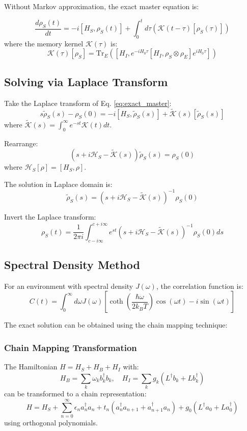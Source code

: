 \documentclass[12pt]{article}
\begin{document}
Without Markov approximation, the exact master equation is:

\begin{equation}
\frac{d\rho_S(t)}{dt} = -i[H_S, \rho_S(t)] + \int_0^t d\tau \left( \mathcal{K}(t-\tau)[\rho_S(\tau)] \right)
\label{eq:exact_master}
\end{equation}
where the memory kernel $\mathcal{K}(\tau)$ is:
\[
\mathcal{K}(\tau)[\rho_S] = \text{Tr}_E\left( [H_I, e^{-iH_0\tau}[H_I, \rho_S \otimes \rho_E] e^{iH_0\tau}] \right)
\]

\subsection{Solving via Laplace Transform}

Take the Laplace transform of Eq. \eqref{eq:exact_master}:
\[
s\tilde{\rho}_S(s) - \rho_S(0) = -i[H_S, \tilde{\rho}_S(s)] + \tilde{\mathcal{K}}(s)[\tilde{\rho}_S(s)]
\]
where $\tilde{\mathcal{K}}(s) = \int_0^\infty e^{-st} \mathcal{K}(t) dt$.

Rearrange:
\[
\left( s + i\mathcal{H}_S - \tilde{\mathcal{K}}(s) \right) \tilde{\rho}_S(s) = \rho_S(0)
\]
where $\mathcal{H}_S[\rho] = [H_S, \rho]$.

The solution in Laplace domain is:
\[
\tilde{\rho}_S(s) = \left( s + i\mathcal{H}_S - \tilde{\mathcal{K}}(s) \right)^{-1} \rho_S(0)
\]

Invert the Laplace transform:
\[
\rho_S(t) = \frac{1}{2\pi i} \int_{c-i\infty}^{c+i\infty} e^{st} \left( s + i\mathcal{H}_S - \tilde{\mathcal{K}}(s) \right)^{-1} \rho_S(0) ds
\]

\subsection{Spectral Density Method}

For an environment with spectral density $J(\omega)$, the correlation function is:
\[
C(t) = \int_0^\infty d\omega J(\omega) \left[ \coth\left(\frac{\hbar\omega}{2k_B T}\right) \cos(\omega t) - i \sin(\omega t) \right]
\]

The exact solution can be obtained using the chain mapping technique:

\subsubsection{Chain Mapping Transformation}
The Hamiltonian $H = H_S + H_B + H_I$ with:
\[
H_B = \sum_k \omega_k b_k^\dagger b_k, \quad H_I = \sum_k g_k (L^\dagger b_k + L b_k^\dagger)
\]
can be transformed to a chain representation:
\[
H = H_S + \sum_{n=0}^\infty \epsilon_n a_n^\dagger a_n + t_n (a_n^\dagger a_{n+1} + a_{n+1}^\dagger a_n) + g_0 (L^\dagger a_0 + L a_0^\dagger)
\]
using orthogonal polynomials.
\end{document}

